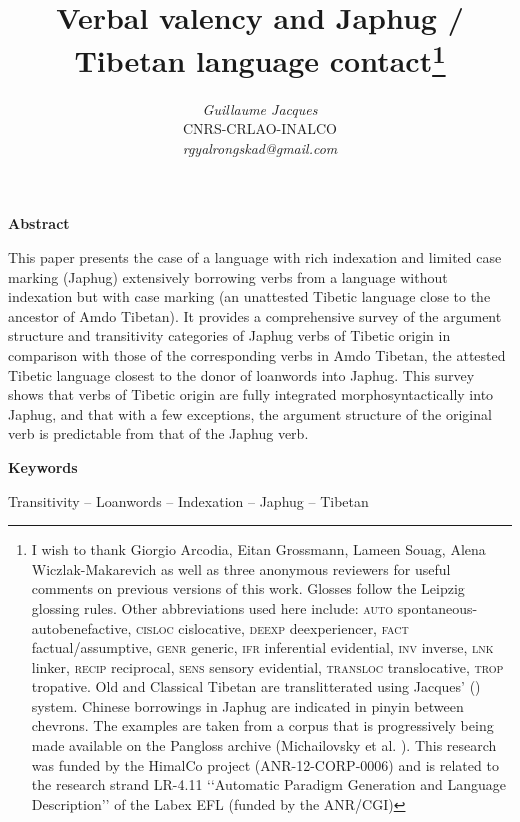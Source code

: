 \documentclass[oneside,a4paper,11pt]{article}
\makeatletter
\renewcommand{\maketitle}{\bgroup\setlength{\parindent}{0pt}
\begin{flushleft}
  \textbf{\@title}

  \@author
\end{flushleft}\egroup
}
\makeatother
\begin{document}
 
\title{\huge{Verbal valency and Japhug / Tibetan language contact}\footnote{I wish to thank Giorgio Arcodia, Eitan Grossmann, Lameen Souag, Alena Wiczlak-Makarevich as well as three anonymous reviewers for useful comments on previous versions of this work. Glosses follow the Leipzig glossing rules. Other abbreviations used here include: \textsc{auto} spontaneous-autobenefactive, \textsc{cisloc} cislocative,  \textsc{deexp} deexperiencer, \textsc{fact} factual/assumptive, \textsc{genr} generic, \textsc{ifr} inferential evidential,  \textsc{inv} inverse, \textsc{lnk} linker, \textsc{recip} reciprocal, \textsc{sens} sensory  evidential, \textsc{transloc} translocative, \textsc{trop} tropative.  Old and Classical Tibetan are translitterated using Jacques' (\citeyear{jacques12transcription}) system.  Chinese borrowings in Japhug are indicated in pinyin between chevrons. The examples are taken from a corpus that is progressively being made available on the Pangloss archive (Michailovsky et al. \citeyear{michailovsky14pangloss}). This research was funded by the HimalCo project (ANR-12-CORP-0006) and is related to the research strand LR-4.11 ‘‘Automatic Paradigm Generation and Language Description’’ of the Labex EFL (funded by the ANR/CGI) }} 
\author{\textit{Guillaume Jacques}\\CNRS-CRLAO-INALCO\\\textit{rgyalrongskad@gmail.com}}
\date{}
\maketitle 

\textbf{Abstract}

\noindent
This paper presents the case of a language with rich indexation and limited case marking (Japhug) extensively borrowing verbs from a language without indexation but with case marking (an unattested Tibetic language close to the ancestor of Amdo Tibetan). It provides a comprehensive survey of the argument structure and transitivity categories of Japhug verbs of Tibetic origin in comparison with those of the corresponding verbs in Amdo Tibetan, the attested Tibetic language closest to the donor of loanwords into Japhug. This survey shows that verbs of Tibetic origin are fully integrated morphosyntactically into Japhug, and that with a few exceptions, the argument structure of the original verb is predictable from that of the Japhug verb.

\textbf{Keywords}

\noindent
Transitivity -- Loanwords -- Indexation -- Japhug -- Tibetan
\end{document}
